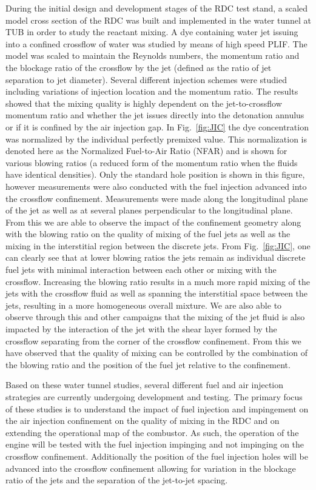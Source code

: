 \documentclass[]{aiaa-tc}%
\begin{document}
During the initial design and development stages of the RDC test stand, a scaled model cross section of the RDC was built and implemented in the water tunnel at TUB in order to study the reactant mixing. A dye containing water jet issuing into a confined crossflow of water was studied by means of high speed PLIF. The model was scaled to maintain the Reynolds numbers, the momentum ratio and the blockage ratio of the crossflow by the jet (defined as the ratio of jet separation to jet diameter). Several different injection schemes were studied including variations of injection location and the momentum ratio. The results showed that the mixing quality is highly dependent on the jet-to-crossflow momentum ratio and whether the jet issues directly into the detonation annulus or if it is confined by the air injection gap. In Fig.~\ref{fig:JIC} the dye concentration was normalized by the individual perfectly premixed value. This normalization is denoted here as the Normalized Fuel-to-Air Ratio (NFAR) and is shown for various blowing ratios (a reduced form of the momentum ratio when the fluids have identical densities). Only the standard hole position is shown in this figure, however measurements were also conducted with the fuel injection advanced into the crossflow confinement. Measurements were made along the longitudinal plane of the jet as well as at several planes perpendicular to the longitudinal plane. From this we are able to observe the impact of the confinement geometry along with the blowing ratio on the quality of mixing of the fuel jets as well as the mixing in the interstitial region between the discrete jets. From Fig.~\ref{fig:JIC}, one can clearly see that at lower blowing ratios the jets remain as individual discrete fuel jets with minimal interaction between each other or mixing with the crossflow. Increasing the blowing ratio results in a much more rapid mixing of the jets with the crossflow fluid as well as spanning the interstitial space between the jets, resulting in a more homogeneous overall mixture. We are also able to observe through this and other campaigns that the mixing of the jet fluid is also impacted by the interaction of the jet with the shear layer formed by the crossflow separating from the corner of the crossflow confinement. From this we have observed that the quality of mixing can be controlled by the combination of the blowing ratio and the position of the fuel jet relative to the confinement. 

Based on these water tunnel studies, several different fuel and air injection strategies are currently undergoing development and testing. The primary focus of these studies is to understand the impact of fuel injection and impingement on the air injection confinement on the quality of mixing in the RDC and on extending the operational map of the combustor. As such, the operation of the engine will be tested with the fuel injection impinging and not impinging on the crossflow confinement. Additionally the position of the fuel injection holes will be advanced into the crossflow confinement allowing for variation in the blockage ratio of the jets and the separation of the jet-to-jet spacing.
\end{document}
